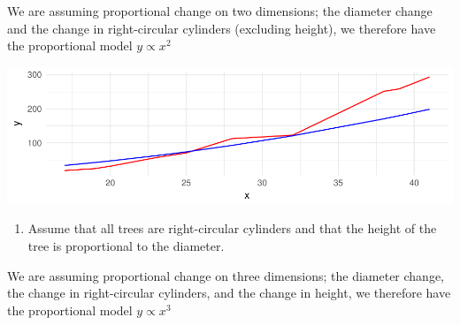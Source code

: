 \documentclass[]{article}
\newenvironment{Shaded}{\begin{snugshade}}{\end{snugshade}}
\newcommand{\KeywordTok}[1]{\textcolor[rgb]{0.13,0.29,0.53}{\textbf{{#1}}}}
\newcommand{\DataTypeTok}[1]{\textcolor[rgb]{0.13,0.29,0.53}{{#1}}}
\newcommand{\DecValTok}[1]{\textcolor[rgb]{0.00,0.00,0.81}{{#1}}}
\newcommand{\StringTok}[1]{\textcolor[rgb]{0.31,0.60,0.02}{{#1}}}
\newcommand{\NormalTok}[1]{{#1}}
\providecommand{\tightlist}{%
  \setlength{\itemsep}{0pt}\setlength{\parskip}{0pt}}
\begin{document}
We are assuming proportional change on two dimensions; the diameter
change and the change in right-circular cylinders (excluding height), we
therefore have the proportional model \(y \propto x^2\)

\begin{Shaded}
\end{Shaded}

\includegraphics{CHunt_homework2_files/figure-latex/unnamed-chunk-3-1.pdf}

\newpage

\begin{enumerate}
\def\labelenumi{\roman{enumi}.}
\setcounter{enumi}{1}
\tightlist
\item
  Assume that all trees are right-circular cylinders and that the height
  of the tree is proportional to the diameter.
\end{enumerate}

We are assuming proportional change on three dimensions; the diameter
change, the change in right-circular cylinders, and the change in
height, we therefore have the proportional model \(y \propto x^3\)
\end{document}
